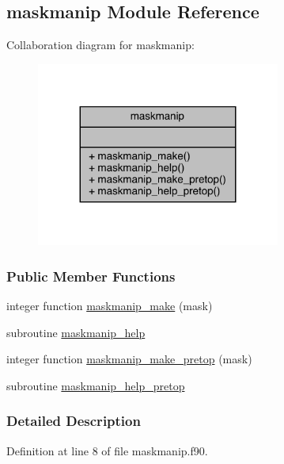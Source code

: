 \hypertarget{classmaskmanip}{\subsection{maskmanip Module Reference}
\label{classmaskmanip}
}


Collaboration diagram for maskmanip\-:
\nopagebreak
\begin{figure}[H]
\begin{center}
\leavevmode
\includegraphics[width=227pt]{classmaskmanip__coll__graph}
\end{center}
\end{figure}
\subsubsection*{Public Member Functions}
\begin{DoxyCompactItemize}
\item 
integer function \hyperlink{classmaskmanip_a716ed52ce2766e5a0ee111f885e7287f}{maskmanip\-\_\-make} (mask)
\item 
subroutine \hyperlink{classmaskmanip_a32c8614b8e223757850273cd6a47927e}{maskmanip\-\_\-help}
\item 
integer function \hyperlink{classmaskmanip_aa7d710d064627916cae7417ab446621c}{maskmanip\-\_\-make\-\_\-pretop} (mask)
\item 
subroutine \hyperlink{classmaskmanip_a5763e47ad08d36439f7f196960a00cf7}{maskmanip\-\_\-help\-\_\-pretop}
\end{DoxyCompactItemize}


\subsubsection{Detailed Description}


Definition at line 8 of file maskmanip.\-f90.



